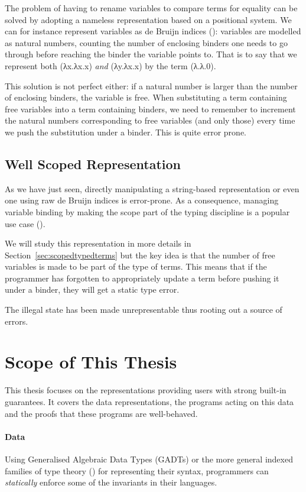 The problem of having to rename variables to compare terms for
equality can be solved by adopting a nameless representation
based on a positional system.
%
We can for instance represent variables as de Bruijn indices
(\citeyear{de1972lambda}): variables are modelled as natural numbers,
counting the number of enclosing binders one needs to go through before
reaching the binder the variable points to. That is to say that we
represent both (λx.λx.x) \emph{and} (λy.λx.x) by the term (λ.λ.0).

This solution is not perfect either: if a natural number is larger
than the number of enclosing binders, the variable is free. When
substituting a term containing free variables into a term containing
binders, we need to remember to increment the natural numbers
corresponding to free variables (and only those) every time we push
the substitution under a binder. This is quite error prone.

\subsection{Well Scoped Representation}

As we have just seen, directly manipulating a string-based representation
or even one using raw de Bruijn indices is error-prone. As a consequence,
managing variable binding by making the scope part of the typing discipline
is a popular use case
(\cite{BELLEGARDE1994287,bird_paterson_1999,altenkirch1999monadic}).

We will study this representation in more details in
Section~\ref{sec:scopedtypedterms} but the key idea is that the number
of free variables is made to be part of the type of terms. This means that
if the programmer has forgotten to appropriately update a term before pushing
it under a binder, they will get a static type error.

The illegal state has been made unrepresentable thus rooting out a source
of errors.

\section{Scope of This Thesis}

This thesis focuses on the representations providing users with strong
built-in guarantees. It covers the data representations, the programs
acting on this data and the proofs that these programs are well-behaved.

\paragraph{Data}
Using Generalised Algebraic Data Types (GADTs) or the more general indexed
families of type theory (\cite{dybjer1994inductive}) for representing their
syntax, programmers can \emph{statically} enforce some of the invariants
in their languages.

